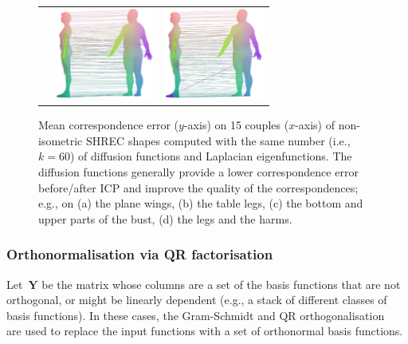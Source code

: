 \documentclass[acmtog,authorversion]{acmart}
\begin{document}
\begin{figure}
\begin{tabular}{c|c|c}
&\includegraphics[height=85pt]{FMAP-images/human-Source=5-Target=10-General-Basis-ZOOM.jpg}
&\includegraphics[height=85pt]{FMAP-images/human-Source=5-Target=10-Lapl-Eig-ZOOM.jpg}
\end{tabular}
\caption{Mean correspondence error ($y$-axis) on 15 couples ($x$-axis) of non-isometric SHREC shapes computed with the same number (i.e., \mbox{$k=60$}) of diffusion functions and Laplacian eigenfunctions. The diffusion functions generally provide a lower correspondence error before/after ICP and improve the quality of the correspondences; e.g., on (a) the plane wings, (b) the table legs, (c) the bottom and upper parts of the bust, (d) the legs and the harms.\label{fig:SHREC-DIFF-LAPL-SELECTION}}
\end{figure}
%
\subsubsection{Orthonormalisation via QR factorisation\label{sec:QR-ORHTONORMALIZAION}}
Let~$\mathbf{Y}$ be the matrix whose columns are a set of the basis functions that are not orthogonal, or might be linearly dependent (e.g., a stack of different classes of basis functions). In these cases, the Gram-Schmidt and QR orthogonalisation~\citep{GOLUB1989} are used to replace the input functions with a set of orthonormal basis functions.

\end{document}
